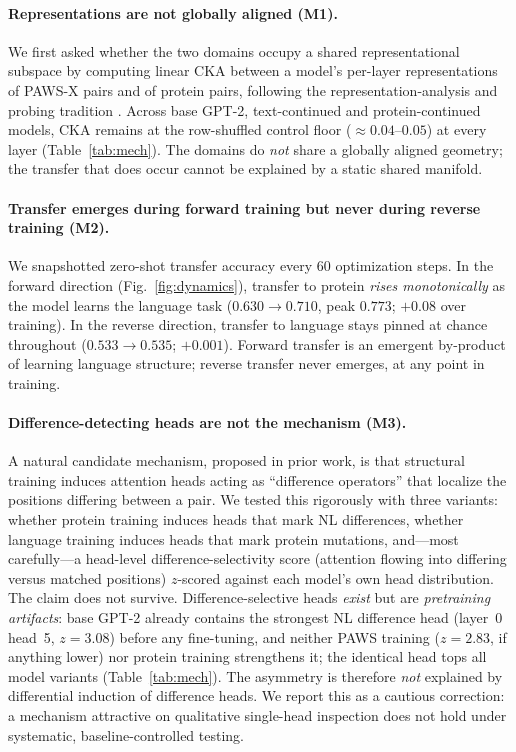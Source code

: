 \documentclass[11pt]{article}
\begin{document}
\paragraph{Representations are not globally aligned (M1).} We first asked whether the two domains
occupy a shared representational subspace by computing linear CKA \cite{zhang2019cka,kornblith2019similarity}
between a model's per-layer representations of PAWS-X pairs and of protein pairs, following the
representation-analysis and probing tradition \cite{tenney2019bert,hewitt2019probe}. Across base GPT-2,
text-continued and protein-continued models, CKA remains at the row-shuffled control floor
($\approx 0.04$--$0.05$) at every layer (Table~\ref{tab:mech}). The domains do \emph{not} share a
globally aligned geometry; the transfer that does occur cannot be explained by a static shared
manifold.

\paragraph{Transfer emerges during forward training but never during reverse training (M2).}
We snapshotted zero-shot transfer accuracy every 60 optimization steps. In the forward direction (Fig.~\ref{fig:dynamics}),
transfer to protein \emph{rises monotonically} as the model learns the language task
($0.630 \rightarrow 0.710$, peak $0.773$; $+0.08$ over training). In the reverse direction,
transfer to language stays pinned at chance throughout ($0.533 \rightarrow 0.535$; $+0.001$).
Forward transfer is an emergent by-product of learning language structure; reverse transfer never
emerges, at any point in training.

\paragraph{Difference-detecting heads are not the mechanism (M3).} A natural candidate mechanism,
proposed in prior work, is that structural training induces attention heads acting as ``difference
operators'' that localize the positions differing between a pair. We tested this rigorously with
three variants: whether protein training induces heads that mark NL differences, whether language
training induces heads that mark protein mutations, and---most carefully---a head-level
difference-selectivity score (attention flowing into differing versus matched positions) $z$-scored
against each model's own head distribution. The claim does not survive. Difference-selective heads
\emph{exist} but are \emph{pretraining artifacts}: base GPT-2 already contains the strongest NL
difference head (layer~0 head~5, $z=3.08$) before any fine-tuning, and neither PAWS training
($z=2.83$, if anything lower) nor protein training strengthens it; the identical head tops all model
variants (Table~\ref{tab:mech}). The asymmetry is therefore \emph{not} explained by differential
induction of difference heads. We report this as a cautious correction: a mechanism attractive on
qualitative single-head inspection does not hold under systematic, baseline-controlled testing.
\end{document}
